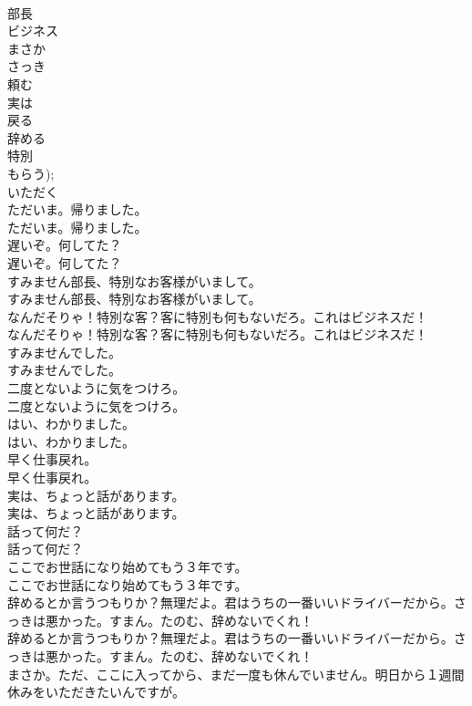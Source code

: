 \documentclass[8pt]{extreport}
\begin{document}
\begin{CJK}{UTF8}{min}
\\	部長
\\	ビジネス
\\	まさか
\\	さっき
\\	頼む
\\	実は
\\	戻る
\\	辞める
\\	特別
\\	もらう); 
\\	いただく
\\	ただいま。帰りました。	
\\	ただいま。帰りました。 
\\	遅いぞ。何してた？	
\\	遅いぞ。何してた？ 
\\	すみません部長、特別なお客様がいまして。	
\\	すみません部長、特別なお客様がいまして。 
\\	なんだそりゃ！特別な客？客に特別も何もないだろ。これはビジネスだ！	
\\	なんだそりゃ！特別な客？客に特別も何もないだろ。これはビジネスだ！ 
\\	すみませんでした。	
\\	すみませんでした。 
\\	二度とないように気をつけろ。	
\\	二度とないように気をつけろ。 
\\	はい、わかりました。	
\\	はい、わかりました。 
\\	早く仕事戻れ。	
\\	早く仕事戻れ。 
\\	実は、ちょっと話があります。	
\\	実は、ちょっと話があります。 
\\	話って何だ？	
\\	話って何だ？ 
\\	ここでお世話になり始めてもう３年です。	
\\	ここでお世話になり始めてもう３年です。 
\\	辞めるとか言うつもりか？無理だよ。君はうちの一番いいドライバーだから。さっきは悪かった。すまん。たのむ、辞めないでくれ！	
\\	辞めるとか言うつもりか？無理だよ。君はうちの一番いいドライバーだから。さっきは悪かった。すまん。たのむ、辞めないでくれ！ 
\\	まさか。ただ、ここに入ってから、まだ一度も休んでいません。明日から１週間休みをいただきたいんですが。	

\end{CJK}
\end{document}
